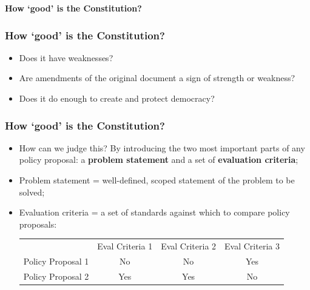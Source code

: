 \documentclass[aspectratio=169]{beamer}
\theoremstyle{principle}
\begin{document}
\begin{frame}

\begin{center} 
\Huge\textbf{How `good' is the Constitution?}
\end{center}

\end{frame}

\begin{frame}
\frametitle{How `good' is the Constitution?}
\begin{itemize}
\item<1-> Does it have weaknesses?
\bigskip
\bigskip
\item<2-> Are amendments of the original document a sign of strength or weakness?
\bigskip
\bigskip
\item<3-> Does it do enough to create and protect democracy?
\end{itemize}

\end{frame}

\begin{frame}
\frametitle{How `good' is the Constitution?}

\begin{itemize}
\item<1-> How can we judge this?  By introducing the two most important parts of any policy proposal: a \textbf{problem statement} and a set of \textbf{evaluation criteria};
\bigskip
\bigskip

\item<1-> Problem statement = well-defined, scoped statement of the problem to be solved;
\bigskip
\bigskip

\item<2-> Evaluation criteria = a set of standards against which to compare policy proposals:
\bigskip
\begin{center}
\begin{tabular}{ cccc } 
  & Eval Criteria 1 & Eval Criteria 2 & Eval Criteria 3\\ 
 Policy Proposal 1 & No & No & Yes\\ 
 Policy Proposal 2 & Yes & Yes & No \\ 

\end{tabular}
\end{center}
\bigskip
\bigskip
\bigskip
\end{itemize}

\end{frame}
\end{document}
